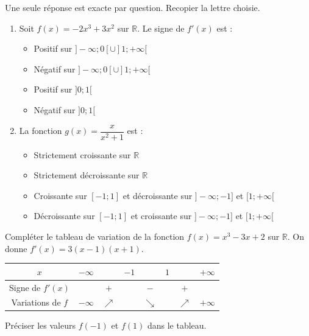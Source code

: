 \documentclass[11pt]{article}
\begin{document}
\begin{exercice}
Une seule réponse est exacte par question. Recopier la lettre choisie.
\begin{enumerate}
    \item Soit $f(x) = -2x^3 + 3x^2$ sur $\mathbb{R}$. Le signe de $f'(x)$ est :
    \begin{itemize}
        \item[A.] Positif sur $]-\infty; 0[ \cup ]1; +\infty[$
        \item[B.] Négatif sur $]-\infty; 0[ \cup ]1; +\infty[$
        \item[C.] Positif sur $]0; 1[$
        \item[D.] Négatif sur $]0; 1[$
    \end{itemize}
    \item La fonction $g(x) = \dfrac{x}{x^2+1}$ est :
    \begin{itemize}
        \item[A.] Strictement croissante sur $\mathbb{R}$
        \item[B.] Strictement décroissante sur $\mathbb{R}$
        \item[C.] Croissante sur $[-1; 1]$ et décroissante sur $]-\infty; -1]$ et $[1; +\infty[$
        \item[D.] Décroissante sur $[-1; 1]$ et croissante sur $]-\infty; -1]$ et $[1; +\infty[$
    \end{itemize}
\end{enumerate}
\end{exercice}

\begin{exercice}
Compléter le tableau de variation de la fonction $f(x) = x^3 - 3x + 2$ sur $\mathbb{R}$.
On donne $f'(x) = 3(x-1)(x+1)$.

\begin{center}
\begin{tabular}{|c|cccccc|c|}
\hline
$x$ & $-\infty$ & & $-1$ & & $1$ & & $+\infty$ \\
\hline
Signe de $f'(x)$ & & $+$ & & $-$ & & $+$ & \\
\hline
Variations de $f$ & $-\infty$ & $\nearrow$ & & $\searrow$ & & $\nearrow$ & $+\infty$ \\
\hline
\end{tabular}
\end{center}
Préciser les valeurs $f(-1)$ et $f(1)$ dans le tableau.
\end{exercice}
\end{document}
